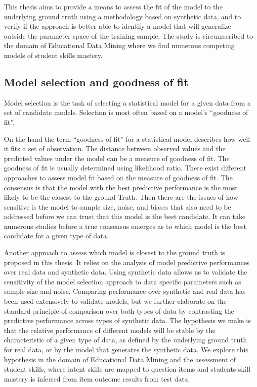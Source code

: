 This thesis aims to provide a means to assess the fit of the model to the underlying ground truth using a methodology based on synthetic data, and to verify if the approach is better able to identify a model that will generalize outside the parameter space of the training sample.  The study is circumscribed to the domain of Educational Data Mining where we find numerous competing models of student skills mastery.

\subsection{Model selection and goodness of fit}

Model selection is the task of selecting a statistical model for a given data from a set of candidate models.  Selection is most often based on a model's ``goodness of fit''.

On the hand the term ``goodness of fit''  for a statistical model describes how well it fits a set of observation. The distance between observed values and the predicted values under the model can be a measure of goodness of fit. The goodness of fit is usually determined using likelihood ratio. There exist different approaches to assess model fit based on the measure of goodness of fit. The consensus is that the model with the best predictive performance is the most likely to be the closest to the ground Truth. Then there are the issues of how sensitive is the model to sample size, noise, and biases that also need to be addressed before we can trust that this model is the best candidate. It can take numerous studies before a true consensus emerges as to which model is the best candidate for a given type of data.

Another approach to assess which model is closest to the ground truth is proposed in this thesis. It relies on the analysis of model predictive performances over real data and synthetic data. Using synthetic data allows us to validate the sensitivity of the model selection approach to data specific parameters such as sample size and noise. Comparing performance over synthetic and real data has been used extensively to validate models, but we further elaborate on the standard principle of comparison over both types of data by contrasting the predictive performance across types of synthetic data.  The hypothesis we make is that the relative performance of different models will be stable by the characteristic of a given type of data, as defined by the underlying ground truth for real data, or by the model that generates the synthetic data.  We explore this hypothesis in the domain of Educational Data Mining and the assessment of student skills, where latent skills are mapped to question items and students skill mastery is inferred from item outcome results from test data. 


